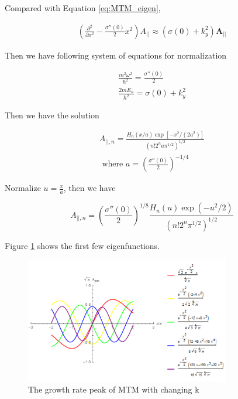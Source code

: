 Compared with Equation \ref{eq:MTM_eigen}, 

\begin{eqnarray}
     (\frac{\partial^2 }{\partial x^2}-\frac{\sigma''(0)}{2}x^2)A_{||}\approx (\sigma(0)+k_y^2) \textbf{A}_{||}
\end{eqnarray}

Then we have following system of equations for normalization

\begin{equation}
    \begin{aligned}
    \frac{m^2\omega^2}{\hbar^2}=\frac{\sigma''(0)}{2}\\
    \frac{2mE_n}{\hbar^2}=\sigma(0)+k_y^2
    \end{aligned}
\end{equation}

Then we have the solution 

\begin{equation}
\begin{array}{l}{A_{||,n}=\frac{H_{n}(x / a) \exp \left[-x^{2} /\left(2 a^{2}\right)\right]}{\left(n ! 2^{n} a \pi^{1 / 2}\right)^{1 / 2}}} 
\\
{\text { where } a=\left(\frac{\sigma''(0)}{2}\right)^{-1 / 4}}
\end{array}
\end{equation}

Normalize $u=\frac{x}{a}$, then we have

\begin{equation}
    A_{||,n}=\left(\frac{\sigma''(0)}{2}\right)^{1 / 8}\frac{H_{n}(u) \exp \left(-u^{2} /2 \right)}{\left(n ! 2^{n}  \pi^{1 / 2}\right)^{1 / 2}}
\end{equation}

Figure \ref{fig:A_para} shows the first few eigenfunctions. 

\begin{figure}[h] \centering
        \includegraphics[width=0.8\textwidth]{Image/A_para.PNG}
        \caption{The growth rate peak of MTM with changing k}
        \label{fig:A_para}
\end{figure}



